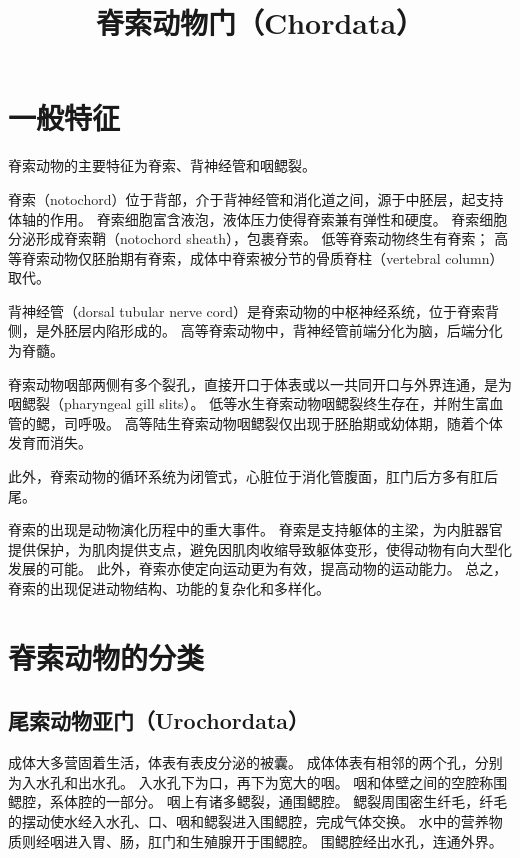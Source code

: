\documentclass[11pt]{article}
\title{脊索动物门（Chordata）}
\date{}
\begin{document}
  \maketitle

  \linenumbers
  
\section{一般特征}
脊索动物的主要特征为脊索、背神经管和咽鳃裂。

\newline

脊索（notochord）位于背部，介于背神经管和消化道之间，源于中胚层，起支持体轴的作用。
脊索细胞富含液泡，液体压力使得脊索兼有弹性和硬度。
脊索细胞分泌形成脊索鞘（notochord sheath），包裹脊索。
低等脊索动物终生有脊索；
高等脊索动物仅胚胎期有脊索，成体中脊索被分节的骨质脊柱（vertebral column）取代。

\newline

背神经管（dorsal tubular nerve cord）是脊索动物的中枢神经系统，位于脊索背侧，是外胚层内陷形成的。
高等脊索动物中，背神经管前端分化为脑，后端分化为脊髓。

\newline

脊索动物咽部两侧有多个裂孔，直接开口于体表或以一共同开口与外界连通，是为咽鳃裂（pharyngeal gill slits）。
低等水生脊索动物咽鳃裂终生存在，并附生富血管的鳃，司呼吸。
高等陆生脊索动物咽鳃裂仅出现于胚胎期或幼体期，随着个体发育而消失。

\newline

此外，脊索动物的循环系统为闭管式，心脏位于消化管腹面，肛门后方多有肛后尾。

\newline

脊索的出现是动物演化历程中的重大事件。
脊索是支持躯体的主梁，为内脏器官提供保护，为肌肉提供支点，避免因肌肉收缩导致躯体变形，使得动物有向大型化发展的可能。
此外，脊索亦使定向运动更为有效，提高动物的运动能力。
总之，脊索的出现促进动物结构、功能的复杂化和多样化。
  
\section{脊索动物的分类}
\subsection{尾索动物亚门（Urochordata）}
成体大多营固着生活，体表有表皮分泌的被囊。
成体体表有相邻的两个孔，分别为入水孔和出水孔。
入水孔下为口，再下为宽大的咽。
咽和体壁之间的空腔称围鳃腔，系体腔的一部分。
咽上有诸多鳃裂，通围鳃腔。
鳃裂周围密生纤毛，纤毛的摆动使水经入水孔、口、咽和鳃裂进入围鳃腔，完成气体交换。
水中的营养物质则经咽进入胃、肠，肛门和生殖腺开于围鳃腔。
围鳃腔经出水孔，连通外界。
\end{document}

